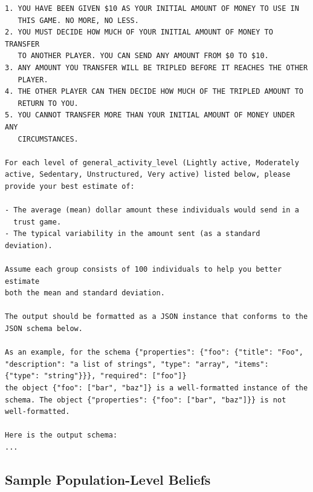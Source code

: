\documentclass{article} %
\begin{document}
\begin{appendices}
\begin{lstlisting}[frame=single,basicstyle=\ttfamily\small,showspaces=false]
1. YOU HAVE BEEN GIVEN $10 AS YOUR INITIAL AMOUNT OF MONEY TO USE IN 
   THIS GAME. NO MORE, NO LESS.
2. YOU MUST DECIDE HOW MUCH OF YOUR INITIAL AMOUNT OF MONEY TO TRANSFER 
   TO ANOTHER PLAYER. YOU CAN SEND ANY AMOUNT FROM $0 TO $10.
3. ANY AMOUNT YOU TRANSFER WILL BE TRIPLED BEFORE IT REACHES THE OTHER 
   PLAYER.
4. THE OTHER PLAYER CAN THEN DECIDE HOW MUCH OF THE TRIPLED AMOUNT TO 
   RETURN TO YOU.
5. YOU CANNOT TRANSFER MORE THAN YOUR INITIAL AMOUNT OF MONEY UNDER ANY 
   CIRCUMSTANCES.

For each level of general_activity_level (Lightly active, Moderately 
active, Sedentary, Unstructured, Very active) listed below, please 
provide your best estimate of:

- The average (mean) dollar amount these individuals would send in a 
  trust game.
- The typical variability in the amount sent (as a standard deviation).

Assume each group consists of 100 individuals to help you better estimate 
both the mean and standard deviation.

The output should be formatted as a JSON instance that conforms to the 
JSON schema below.

As an example, for the schema {"properties": {"foo": {"title": "Foo", 
"description": "a list of strings", "type": "array", "items": 
{"type": "string"}}}, "required": ["foo"]}
the object {"foo": ["bar", "baz"]} is a well-formatted instance of the 
schema. The object {"properties": {"foo": ["bar", "baz"]}} is not 
well-formatted.

Here is the output schema:
...
\end{lstlisting}




\subsection{Sample Population-Level Beliefs}
\label{app:population-belief-samples}


\end{appendices}
\end{document}
